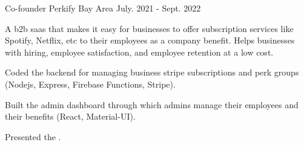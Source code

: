 \begin{cventries}
  \cventry
  {Co-founder}
  {Perkify}
  {Bay Area}
  {July. 2021 - Sept. 2022}
  {
    \begin{cvitems}
    \item{A b2b saas that makes it easy for businesses to offer subscription services like Spotify, Netflix, etc to their employees as a company benefit. Helps businesses with hiring, employee satisfaction, and employee retention at a low cost.}
    \item{Coded the backend for managing business stripe subscriptions and perk groups (Nodejs, Express, Firebase Functions, Stripe).}
    \item{Built the admin dashboard through which admins manage their employees and their benefits (React, Material-UI).}
    \item{Presented the .}
    \end{cvitems}
  }










\end{cventries}
